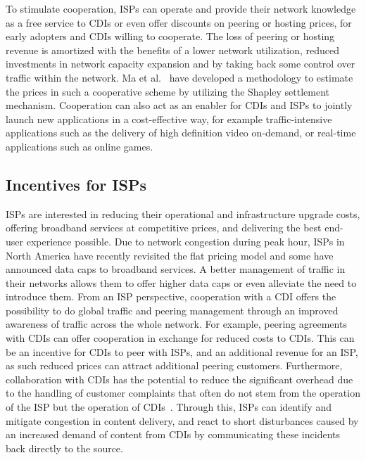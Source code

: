 To stimulate cooperation, ISPs can operate and provide their network
knowledge as a free service to CDIs or even offer discounts on peering or
hosting prices, \eg for early adopters and CDIs willing to cooperate. The loss
of peering or hosting revenue is amortized with the benefits of a lower network
utilization, reduced investments in network capacity expansion and by taking
back some control over traffic within the network. Ma et al.~\cite
{CooperativeSettlement:ToN} have developed a methodology to estimate the prices
in such a cooperative scheme by utilizing the Shapley settlement mechanism.
Cooperation can also act as an enabler for CDIs and ISPs to jointly launch new
applications in a cost-effective way, for example traffic-intensive
applications such as the delivery of high definition video on-demand, or
real-time applications such as online games.

\subsection{Incentives for ISPs}\label{sec:ISP-Incentive} 

ISPs are interested in reducing their operational and infrastructure upgrade
costs, offering broadband services at competitive prices, and delivering the
best end-user experience possible. Due to network congestion during peak hour,
ISPs in North America have recently revisited the flat pricing model and some
have announced data caps to broadband services. A better management of traffic
in their networks allows them to offer higher data caps or even alleviate the
need to introduce them. From an ISP perspective, cooperation with a CDI offers
the possibility to do global traffic and peering management through an improved
awareness of traffic across the whole network. For example, peering agreements
with CDIs can offer cooperation in exchange for reduced costs to CDIs. This can
be an incentive for CDIs to peer with ISPs, and an additional revenue for an
ISP, as such reduced prices can attract additional peering customers.
Furthermore, collaboration with CDIs has the potential to reduce the
significant overhead due to the handling of customer complaints that often do
not stem from the operation of the ISP but the operation of CDIs~\cite
{ControllingDataCloud}. Through this, ISPs can identify and mitigate congestion
in content delivery, and react to short disturbances caused by an increased
demand of content from CDIs by communicating these incidents back directly to
the source.

